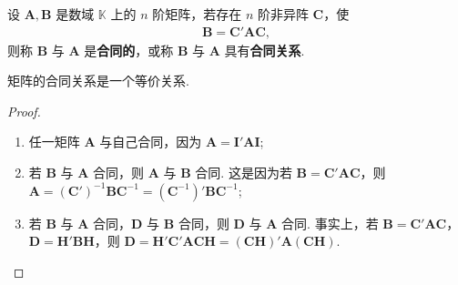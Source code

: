 \documentclass[../../main.tex]{subfiles}
\begin{document}
\begin{definition}[矩阵的合同关系]\label{definition:矩阵的合同关系}
设 $\boldsymbol{A},\boldsymbol{B}$ 是数域 $\mathbb{K}$ 上的 $n$ 阶矩阵，若存在 $n$ 阶非异阵 $\boldsymbol{C}$，使
\begin{align*}
\boldsymbol{B}=\boldsymbol{C}'\boldsymbol{A}\boldsymbol{C},
\end{align*}
则称 $\boldsymbol{B}$ 与 $\boldsymbol{A}$ 是\textbf{合同的}，或称 $\boldsymbol{B}$ 与 $\boldsymbol{A}$ 具有\textbf{合同关系}.
\end{definition}

\begin{theorem}
矩阵的合同关系是一个等价关系.
\end{theorem}
\begin{proof}
\begin{enumerate}
\item 任一矩阵 $\boldsymbol{A}$ 与自己合同，因为 $\boldsymbol{A}=\boldsymbol{I}'\boldsymbol{A}\boldsymbol{I}$;
\item 若 $\boldsymbol{B}$ 与 $\boldsymbol{A}$ 合同，则 $\boldsymbol{A}$ 与 $\boldsymbol{B}$ 合同. 这是因为若 $\boldsymbol{B}=\boldsymbol{C}'\boldsymbol{A}\boldsymbol{C}$，则 $\boldsymbol{A}=(\boldsymbol{C}')^{-1}\boldsymbol{B}\boldsymbol{C}^{-1}=(\boldsymbol{C}^{-1})'\boldsymbol{B}\boldsymbol{C}^{-1}$;
\item 若 $\boldsymbol{B}$ 与 $\boldsymbol{A}$ 合同，$\boldsymbol{D}$ 与 $\boldsymbol{B}$ 合同，则 $\boldsymbol{D}$ 与 $\boldsymbol{A}$ 合同. 事实上，若 $\boldsymbol{B}=\boldsymbol{C}'\boldsymbol{A}\boldsymbol{C}$，$\boldsymbol{D}=\boldsymbol{H}'\boldsymbol{B}\boldsymbol{H}$，则 $\boldsymbol{D}=\boldsymbol{H}'\boldsymbol{C}'\boldsymbol{A}\boldsymbol{C}\boldsymbol{H}=(\boldsymbol{C}\boldsymbol{H})'\boldsymbol{A}(\boldsymbol{C}\boldsymbol{H})$.
\end{enumerate} 
\end{proof}
\end{document}
